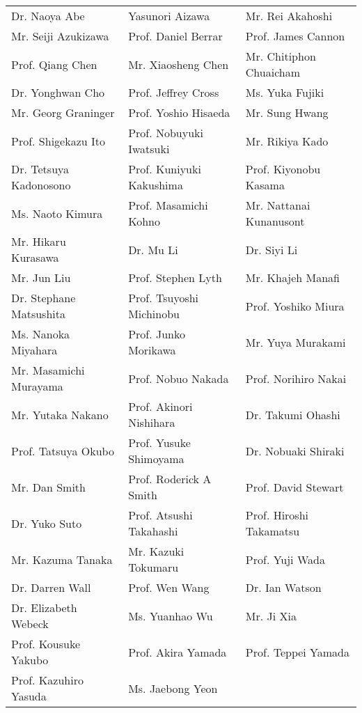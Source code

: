 \begin{tabular}{lll}
Dr. Naoya Abe & Yasunori Aizawa & Mr. Rei Akahoshi \\
Mr. Seiji Azukizawa & Prof. Daniel Berrar & Prof. James Cannon \\
Prof. Qiang Chen & Mr. Xiaosheng Chen & Mr. Chitiphon Chuaicham \\
Dr. Yonghwan Cho & Prof. Jeffrey Cross & Ms. Yuka Fujiki \\
Mr. Georg Graninger & Prof. Yoshio Hisaeda & Mr. Sung Hwang \\
Prof. Shigekazu Ito & Prof. Nobuyuki Iwatsuki & Mr. Rikiya Kado \\
Dr. Tetsuya Kadonosono & Prof. Kuniyuki Kakushima & Prof. Kiyonobu Kasama \\
Ms. Naoto Kimura & Prof. Masamichi Kohno & Mr. Nattanai Kunanusont \\
Mr. Hikaru Kurasawa & Dr. Mu Li & Dr. Siyi Li \\
Mr. Jun Liu & Prof. Stephen Lyth & Mr. Khajeh Manafi \\
Dr. Stephane Matsushita & Prof. Tsuyoshi Michinobu & Prof. Yoshiko Miura \\
Ms. Nanoka Miyahara & Prof. Junko Morikawa & Mr. Yuya Murakami \\
Mr. Masamichi Murayama & Prof. Nobuo Nakada & Prof. Norihiro Nakai \\
Mr. Yutaka Nakano & Prof. Akinori Nishihara & Dr. Takumi Ohashi \\
Prof. Tatsuya Okubo & Prof. Yusuke Shimoyama & Dr. Nobuaki Shiraki \\
Mr. Dan Smith & Prof. Roderick A Smith & Prof. David Stewart \\
Dr. Yuko Suto & Prof. Atsushi Takahashi & Prof. Hiroshi Takamatsu \\
Mr. Kazuma Tanaka & Mr. Kazuki Tokumaru & Prof. Yuji Wada \\
Dr. Darren Wall & Prof. Wen Wang & Dr. Ian Watson \\
Dr. Elizabeth Webeck & Ms. Yuanhao Wu & Mr. Ji Xia \\
Prof. Kousuke Yakubo & Prof. Akira Yamada & Prof. Teppei Yamada \\
Prof. Kazuhiro Yasuda & Ms. Jaebong Yeon & \\
\end{tabular}

